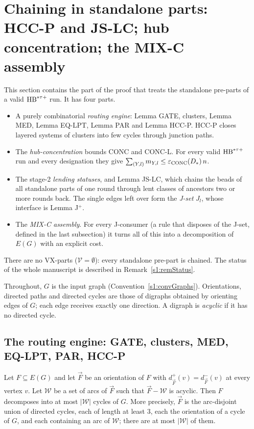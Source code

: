 \section{Chaining in standalone parts: HCC-P and JS-LC; hub concentration; the MIX-C assembly}\label{s6:sec}

This section contains the part of the \candidate{} proof that treats the standalone pre-parts of a valid $\mathrm{HB}^{*\tau{+}}$ run. It has four parts.
\begin{itemize}
\item A purely combinatorial \emph{routing engine}: Lemma GATE, clusters, Lemma MED, Lemma EQ-LPT, Lemma PAR and Lemma HCC-P. HCC-P closes layered systems of clusters into few cycles through junction paths.
\item The \emph{hub-concentration} bounds CONC and CONC-L. For every valid $\mathrm{HB}^{*\tau{+}}$ run and every designation they give $\sum_{(Y,l)}m_{Y,l}\le\varepsilon_{\mathrm{CONC}}(D_{*})\,n$.
\item The stage-2 \emph{lending statuses}, and Lemma JS-LC, which chains the beads of all standalone parts of one round through lent classes of ancestors two or more rounds back. The single edges left over form the \emph{J-set} $J_l$, whose interface is Lemma J$^+$.
\item The \emph{MIX-C assembly}. For every J-consumer (a rule that disposes of the J-set, defined in the last subsection) it turns all of this into a decomposition of $E(G)$ with an explicit cost.
\end{itemize}
There are no VX-parts ($\mathcal V=\emptyset$): every standalone pre-part is chained. The status of the whole manuscript is described in Remark~\ref{s1:remStatus}.

Throughout, $G$ is the input graph (Convention~\ref{s1:convGraphs}). Orientations, directed paths and directed cycles are those of digraphs obtained by orienting edges of $G$; each edge receives exactly one direction. A digraph is \emph{acyclic} if it has no directed cycle.

\subsection{The routing engine: GATE, clusters, MED, EQ-LPT, PAR, HCC-P}

\begin{lemma}\label{s6:lemGATE}
Let $F\subseteq E(G)$ and let $\vec F$ be an orientation of $F$ with $d^+_{\vec F}(v)=d^-_{\vec F}(v)$ at every vertex $v$. Let $\mathcal W$ be a set of arcs of $\vec F$ such that $\vec F-\mathcal W$ is acyclic. Then $F$ decomposes into at most $|\mathcal W|$ cycles of $G$. More precisely, $\vec F$ is the arc-disjoint union of directed cycles, each of length at least $3$, each the orientation of a cycle of $G$, and each containing an arc of $\mathcal W$; there are at most $|\mathcal W|$ of them.
\deps{\ref{s1:defObject}}
\end{lemma}

